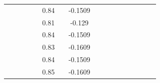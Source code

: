 \documentclass[a4paper,12pt]{article}
\begin{document}
\begin{landscape}
\begin{table}[]
\begin{tabular}{|c|c|c|c|c|c|c|c|c|c|c|c|c|c|c|c|c|}
                     &                           &                         &                         &                        & 0.84 &                          & -0.1509 &                          &                          &                           &                           &                        &                           &                                        &                           &                           \\ \cline{6-6} \cline{8-8}
                     &                           &                         &                         &                        & 0.81 &                          & -0.129  &                          &                          &                           &                           &                        &                           &                                        &                           &                           \\ \cline{6-6} \cline{8-8}
                     &                           &                         &                         &                        & 0.84 &                          & -0.1509 &                          &                          &                           &                           &                        &                           &                                        &                           &                           \\ \cline{6-6} \cline{8-8}
                     &                           &                         &                         &                        & 0.83 &                          & -0.1609 &                          &                          &                           &                           &                        &                           &                                        &                           &                           \\ \cline{6-6} \cline{8-8}
                     &                           &                         &                         &                        & 0.84 &                          & -0.1509 &                          &                          &                           &                           &                        &                           &                                        &                           &                           \\ \cline{6-6} \cline{8-8}
                     &                           &                         &                         &                        & 0.85 &                          & -0.1609 &                          &                          &                           &                           &                        &                           &                                        &                           &                           \\ \cline{6-6} \cline{8-8}

\end{tabular}
\end{table}
\end{landscape}
\end{document}
